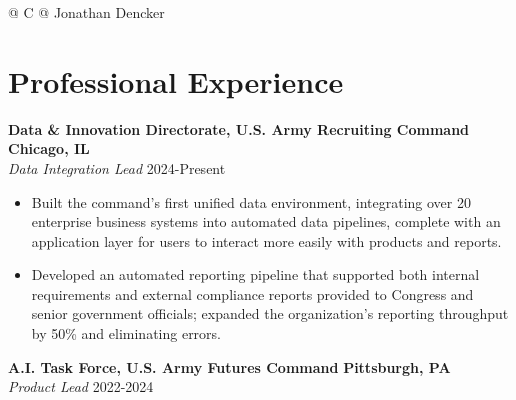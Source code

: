 \documentclass[letterpaper,10pt]{article}
\newenvironment{tightitemize}{%
  \begin{itemize}[
    itemsep=0pt, %
    topsep=0pt, %
    leftmargin=12pt, %
    rightmargin=60pt, %
    parsep=0pt,
    partopsep=0pt,
    label=\scriptsize$\bullet$ %
  ]%
  \footnotesize
}{%
  \end{itemize}
}
\begin{document}
\pagestyle{empty}

\begin{tabularx}{\linewidth}{@{} C @{}}
\huge{Jonathan Dencker}
\\ [10pt]
\end{tabularx}
\vspace{12pt}
\section{Professional Experience}
    \textbf{Data \& Innovation Directorate, U.S. Army Recruiting Command} \hfill \textbf{Chicago, IL} \\
    \hspace*{0.5pt}\textit{Data Integration Lead} \hfill 2024\hspace{2pt}-\hspace{2pt}Present \\
        \vspace{-16pt}
        \begin{tightitemize}
            \item Built the command’s first unified data environment, integrating over 20 enterprise business systems into automated data pipelines, complete with an application layer for users to interact more easily with products and reports.
            \item Developed an automated reporting pipeline that supported both internal requirements and external compliance reports provided to Congress and senior government officials; expanded the organization's reporting throughput by 50\% and eliminating errors. 
        \end{tightitemize}
        \vspace{-2pt}
    \textbf{A.I. Task Force, U.S. Army Futures Command}  \hfill \textbf{Pittsburgh, PA} \\
    \hspace*{0.5pt}\textit{Product Lead} \hfill 2022\hspace{2pt}-\hspace{2pt}2024 \\
        \vspace{-16pt}
\end{document}
